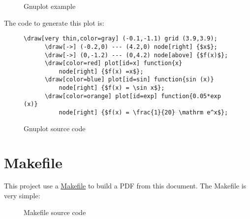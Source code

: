 \documentclass[11pt,a4paper]{article}
\begin{document}
\begin{figure}[h]
  \centering
  \caption{Gnuplot example}
\end{figure}
The code to generate this plot is:
\lstset{basicstyle=\footnotesize\ttfamily}
\begin{figure}[h]
  \begin{lstlisting}[frame=single,language=Gnuplot]
      \draw[very thin,color=gray] (-0.1,-1.1) grid (3.9,3.9);
      \draw[->] (-0.2,0) --- (4.2,0) node[right] {$x$};
      \draw[->] (0,-1.2) --- (0,4.2) node[above] {$f(x)$};
      \draw[color=red] plot[id=x] function{x}
          node[right] {$f(x) =x$};
      \draw[color=blue] plot[id=sin] function{sin (x)}
          node[right] {$f(x) = \sin x$};
      \draw[color=orange] plot[id=exp] function{0.05*exp (x)}
          node[right] {$f(x) = \frac{1}{20} \mathrm e^x$};
  \end{lstlisting}
  \caption{Gnuplot source code}
\end{figure}

\pagebreak[4]

\section*{Makefile}

This project use a \href{https://www.gnu.org/software/make/}{Makefile} to build
a PDF from this document. The Makefile is very simple:

\begin{figure}[h]
  \lstset{basicstyle=\footnotesize\ttfamily}
  
  \caption{Makefile source code}
\end{figure}
\end{document}
